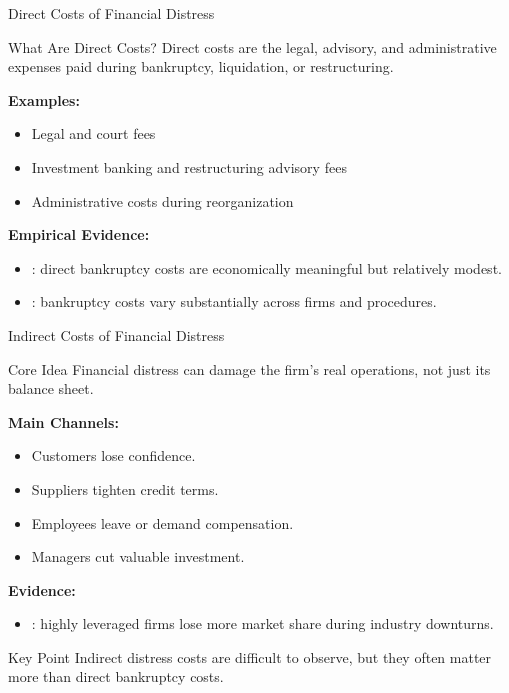 \begin{frame}{Direct Costs of Financial Distress}

\begin{block}{What Are Direct Costs?}
Direct costs are the legal, advisory, and administrative expenses paid during
bankruptcy, liquidation, or restructuring.
\end{block}


\textbf{Examples:}
\begin{itemize}
    \item Legal and court fees
    \item Investment banking and restructuring advisory fees
    \item Administrative costs during reorganization
\end{itemize}


\textbf{Empirical Evidence:}
\begin{itemize}
    \item \textcite{warner1977bankruptcy}: direct bankruptcy costs are economically meaningful but relatively modest.
    \item \textcite{bris2006costs}: bankruptcy costs vary substantially across firms and procedures.
\end{itemize}



\end{frame}


\begin{frame}{Indirect Costs of Financial Distress}
\vspace{-0.2cm}
\begin{block}{Core Idea}
Financial distress can damage the firm's real operations, not just its
balance sheet.
\end{block}

\textbf{Main Channels:}
\begin{itemize}
    \item Customers lose confidence.
    \item Suppliers tighten credit terms.
    \item Employees leave or demand compensation.
    \item Managers cut valuable investment.
\end{itemize}


\textbf{Evidence:}
\begin{itemize}
    \item \textcite{opler1994financial}: highly leveraged firms lose more
    market share during industry downturns.
\end{itemize}


\begin{alertblock}{Key Point}
Indirect distress costs are difficult to observe, but they often matter more
than direct bankruptcy costs.
\end{alertblock}

\end{frame}

